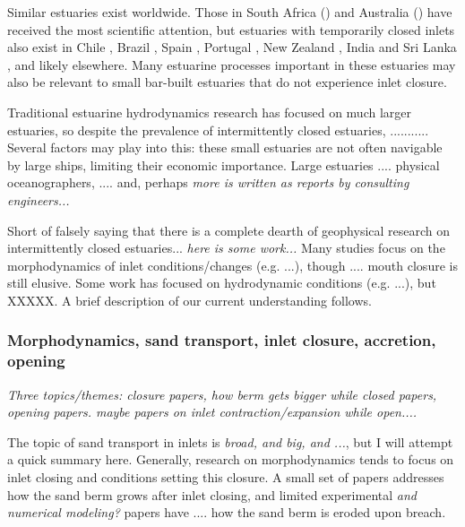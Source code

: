 Similar estuaries exist worldwide. Those in South Africa () and Australia () have received the most scientific attention, but estuaries with temporarily closed inlets also exist in Chile \parencite{dussaillant_water_2009}, Brazil \parencite{suzuki_effects_1998}, Spain \parencite{moreno_morphodynamics_2010}, Portugal \parencite{fortunato_morphological_2014}, New Zealand \parencite{schallenberg_contrasting_2010}, India and Sri Lanka \parencite{ranasinghe_seasonal_2003}, and likely elsewhere. Many estuarine processes important in these estuaries may also be relevant to small bar-built estuaries that do not experience inlet closure. 

Traditional estuarine hydrodynamics research has focused on much larger estuaries, so despite the prevalence of intermittently closed estuaries, ...........  Several factors may play into this: these small estuaries are not often navigable by large ships, limiting their economic importance. Large estuaries .... physical oceanographers, .... and, perhaps \emph{more is written as reports by consulting engineers...}

Short of falsely saying that there is a complete dearth of geophysical research on intermittently closed estuaries... \emph{here is some work...} Many studies focus on the morphodynamics of inlet conditions/changes (e.g. ...), though .... mouth closure is still elusive. Some work has focused on hydrodynamic conditions (e.g. ...), but XXXXX. A brief description of our current understanding follows.

\subsubsection{Morphodynamics, sand transport, inlet closure, accretion, opening}
\emph{Three topics/themes: closure papers, how berm gets bigger while closed papers, opening papers. maybe papers on inlet contraction/expansion while open....}

The topic of sand transport in inlets is \emph{broad, and big, and ...}, but I will attempt a quick summary here. Generally, research on morphodynamics tends to focus on inlet closing and conditions setting this closure. A small set of papers addresses how the sand berm grows after inlet closing, and limited experimental \emph{and numerical modeling?} papers have .... how the sand berm is eroded upon breach.

